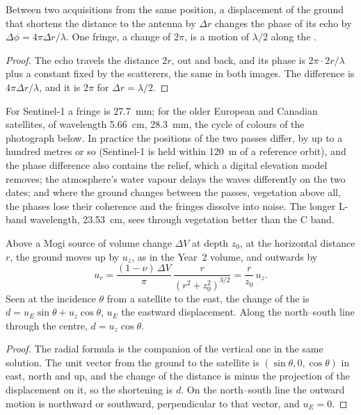 \begin{theorem}\label{thm:b3:remote-sensing-gis:fringe}
Between two acquisitions from the same position, a displacement of the
ground that shortens the distance to the antenna by $\Delta r$ changes the
phase of its echo by $\Delta\phi = 4\pi\Delta r/\lambda$. One fringe, a
change of $2\pi$, is a motion of $\lambda/2$ along the .
\end{theorem}

\begin{proof}
The echo travels the distance $2r$, out and back, and its phase is
$2\pi\cdot 2r/\lambda$ plus a constant fixed by the scatterers, the same in
both images. The difference is $4\pi\Delta r/\lambda$, and it is $2\pi$
for $\Delta r = \lambda/2$.
\end{proof}

For Sentinel-1 a fringe is \qty{27.7}{mm}; for the older European and
Canadian satellites, of wavelength \qty{5.66}{cm}, \qty{28.3}{mm}, the
cycle of colours of the photograph below. In practice the positions of the
two passes differ, by up to a hundred metres or so (Sentinel-1 is held
within \qty{120}{m} of a reference orbit), and the phase difference
also contains the relief, which a digital elevation model removes; the
atmosphere's water vapour delays the waves differently on the two dates;
and where the ground changes between the passes, vegetation above all, the
phases lose their coherence and the fringes dissolve into noise. The longer
L-band wavelength, \qty{23.53}{cm}, sees through vegetation better than the
C band.

\begin{proposition}\label{prop:b3:remote-sensing-gis:mogi-los}
Above a Mogi source of volume change $\Delta V$ at depth $z_0$, at the
horizontal distance $r$, the ground moves up by $u_z$, as in the Year~2
volume, and outwards by
\[
u_r = \frac{(1 - \nu)\,\Delta V}{\pi}\,\frac{r}{(r^2 + z_0^2)^{3/2}} = \frac{r}{z_0}\,u_z .
\]
Seen at the incidence $\theta$ from a satellite to the east, the change of
the  is $d = u_E\sin\theta + u_z\cos\theta$, $u_E$ the
eastward displacement. Along the north--south line through the centre,
$d = u_z\cos\theta$.
\end{proposition}

\begin{proof}
The radial formula is the companion of the vertical one in the same
solution. The unit vector from the ground to the satellite is
$(\sin\theta, 0, \cos\theta)$ in east, north and up, and the change of the
distance is minus the projection of the displacement on it, so the
shortening is $d$. On the north--south line the outward motion is
northward or southward, perpendicular to that vector, and $u_E = 0$.
\end{proof}

